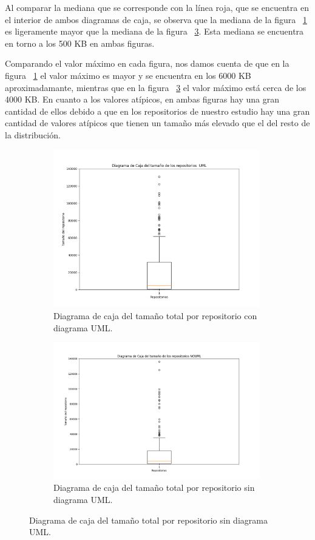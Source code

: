 \documentclass[a4paper, 12pt]{book}
\begin{document}
Al comparar la mediana que se corresponde con la línea roja, que se encuentra en el interior de ambos diagramas de caja, se observa que la mediana de la figura ~\ref{fig:Figure_sizeUML} es ligeramente mayor que la mediana de la figura ~\ref{fig:Figure_sizeNOUML}.
Esta mediana se encuentra en torno a los 500 KB en ambas figuras.


Comparando el valor máximo en cada figura, nos damos cuenta de que en la figura ~\ref{fig:Figure_sizeUML} el valor máximo es mayor y se encuentra en los 6000 KB aproximadamante, mientras que en la figura ~\ref{fig:Figure_sizeNOUML} el valor máximo está cerca de los 4000 KB.
En cuanto a los valores atípicos, en ambas figuras hay una gran cantidad de ellos debido a que en los repositorios de nuestro estudio hay una gran cantidad de valores atípicos que tienen un tamaño más elevado que el del resto de la distribución.

\begin{figure}
  \centering
  \begin{subfigure}{0.45\linewidth}
    \centering
    \includegraphics[width=9cm, keepaspectratio]{img/Figure_sizeUML.png}
    \caption{Diagrama de caja del tamaño total por repositorio con diagrama UML.}\label{fig:Figure_sizeUML}
  \end{subfigure}
  \hfill
    \begin{subfigure}{0.45\linewidth}
      \centering
      \includegraphics[width=9cm, keepaspectratio]{img/Figure_sizeNOUML.png}
      \caption{Diagrama de caja del tamaño total por repositorio sin diagrama UML.}\label{fig:Figure_sizeNOUML}
  \end{subfigure}
\end{figure}
\end{document}
